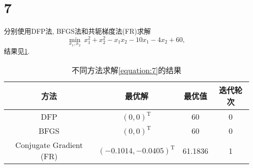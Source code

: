 \section*{7}

分别使用DFP法, BFGS法和共轭梯度法(FR)求解
\begin{equation}
    \min_{x_1,x_2} ~ x_1^2+x_2^2-x_1x_2-10x_1-4x_2+60,
    \label{equation:7}
\end{equation}
结果见\cref{table:7}.

\begin{table}[ht]
    \centering
    \caption{不同方法求解\cref{equation:7}的结果}
    \label{table:7}
    \begin{tabular}{cccc}
        \toprule
        方法 & 最优解 & 最优值 & 迭代轮次 \\
        \midrule
        DFP & $(0, 0)^\mathrm{T}$ & 60 & 0 \\
        BFGS & $(0, 0)^\mathrm{T}$ & 60 & 0 \\
        Conjugate Gradient (FR) & $(-0.1014, -0.0405)^\mathrm{T}$ & 61.1836 & 1 \\
        \bottomrule
    \end{tabular}
\end{table}
